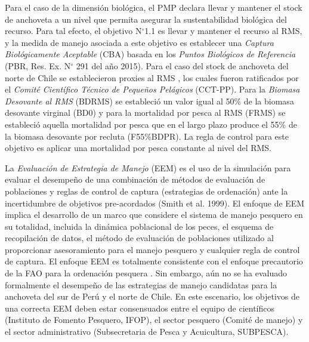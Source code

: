Para el caso de la dimensión biológica, el PMP declara llevar y mantener el stock de anchoveta a un nivel que permita asegurar la sustentabilidad biológica del recurso. Para tal efecto, el objetivo N$^\circ$1.1 es llevar y mantener el recurso al RMS, y la medida de manejo asociada a este objetivo es establecer una \textit{Captura Biológicamente Aceptable} (CBA) basada en los \textit{Puntos Biológicos de Referencia} (PBR, Res. Ex. N$^\circ$ 291 del año 2015). Para el caso del stock de anchoveta del norte de Chile se establecieron proxies al RMS \citep{Paya2014}, los cuales fueron ratificados por el \textit{Comité Científico Técnico de Pequeños Pelágicos} (CCT-PP). Para la \textit{Biomasa Desovante al RMS} (BDRMS) se estableció un valor igual al 50\% de la biomasa desovante virginal (BD0) y para la mortalidad por pesca al RMS (FRMS) se estableció aquella mortalidad por pesca que en el largo plazo produce el 55\% de la biomasa desovante por recluta (F55\%BDPR). La regla de control para este objetivo es aplicar una mortalidad por pesca constante al nivel del RMS.
\newline

La \textit{Evaluación de Estrategia de Manejo} (EEM) es el uso de la simulación para evaluar el desempeño de una combinación de métodos de evaluación de poblaciones y reglas de control de captura (estrategias de ordenación) ante la incertidumbre de objetivos pre-acordados (Smith et al. 1999). El enfoque de EEM implica el desarrollo de un marco que considere el sistema de manejo pesquero en su totalidad, incluida la dinámica poblacional de los peces, el esquema de recopilación de datos, el método de evaluación de poblaciones utilizado al proporcionar asesoramiento para el manejo pesquero y cualquier regla de control de captura. El enfoque EEM es totalmente consistente con el enfoque precautorio de la FAO para la ordenación pesquera \citep{tsukamoto2008refocusing}. Sin embargo, aún no se ha evaluado formalmente el desempeño de las estrategias de manejo candidatas para la anchoveta del sur de Perú y el norte de Chile. En este escenario, los objetivos de una correcta EEM deben estar consensuados entre el equipo de científicos (Instituto de Fomento Pesquero, IFOP), el sector pesquero (Comité de manejo) y el sector administrativo (Subsecretaria de Pesca y Acuicultura, SUBPESCA).

